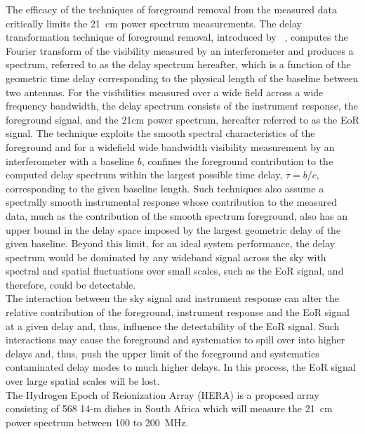 \documentclass[twocolumn]{emulateapj}
\begin{document}
The efficacy of the techniques of foreground removal from the measured data critically limits the 21~cm power spectrum measurements. The delay transformation technique of foreground removal, introduced by  ~\cite{ParsonsBacker2009,Parsons2012}, computes the Fourier transform of the visibility measured by an interferometer and produces a spectrum, referred to as the delay spectrum hereafter, which is a function of the geometric time delay corresponding to the physical length of the baseline between two antennas. For the visibilities measured over a wide field across a wide frequency bandwidth, the delay spectrum consists of the instrument response, the foreground signal, and the 21cm power spectrum, hereafter referred to as the EoR signal.
The technique exploits the smooth spectral characteristics of the foreground and for a widefield wide bandwidth visibility measurement by an interferometer with a baseline $b$, confines the foreground contribution to the computed delay spectrum within the largest possible time delay, $\tau = b/c$, corresponding to the given baseline length. Such techniques also assume a spectrally smooth instrumental response whose contribution to the measured data, much as the contribution of the smooth spectrum foreground, also has an upper bound in the delay space imposed by the largest geometric delay of the given baseline. 
Beyond this limit, for an ideal system performance, the delay spectrum would be dominated by any wideband signal across the sky with spectral and spatial fluctuations over small scales, such as the EoR signal, and therefore, could be detectable.\\
\indent The interaction between the sky signal and instrument response can alter the relative contribution of the foreground, instrument response and the EoR signal at a given delay and, thus, influence the detectability of the EoR signal. Such interactions may cause the foreground and systematics to spill over into higher delays and, thus, push the upper limit of the foreground and systematics contaminated delay modes to much higher delays. In this process, the EoR signal over large spatial scales will be lost. \\
\indent The Hydrogen Epoch of Reionization Array (HERA) is a proposed array consisting of 568 14-m dishes in South Africa which will measure the 21~cm power spectrum between 100 to 200~MHz.
\end{document}
